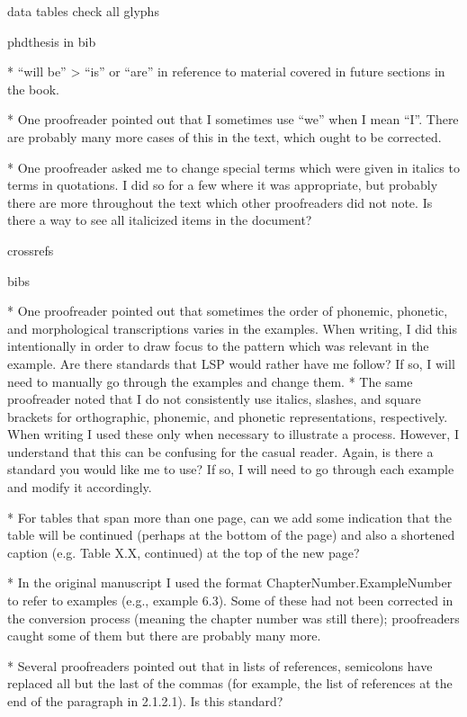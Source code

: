 data 
tables
check all glyphs  

phdthesis in bib
 
  
  *   “will be” > “is” or “are” in reference to material covered in future sections in the book.
 
  *   One proofreader pointed out that I sometimes use “we” when I mean “I”. There are probably many more cases of this in the text, which ought to be corrected.
  
  *   One proofreader asked me to change special terms which were given in italics to terms in quotations. I did so for a few where it was appropriate, but probably there are more throughout the text which other proofreaders did not note. Is there a way to see all italicized items in the document?
  
  crossrefs
  
  bibs
  
  
  
  *   One proofreader pointed out that sometimes the order of phonemic, phonetic, and morphological transcriptions varies in the examples. When writing, I did this intentionally in order to draw focus to the pattern which was relevant in the example. Are there standards that LSP would rather have me follow? If so, I will need to manually go through the examples and change them.
  *   The same proofreader noted that I do not consistently use italics, slashes, and square brackets for orthographic, phonemic, and phonetic representations, respectively. When writing I used these only when necessary to illustrate a process. However, I understand that this can be confusing for the casual reader. Again, is there a standard you would like me to use? If so, I will need to go through each example and modify it accordingly.
  
  
  *   For tables that span more than one page, can we add some indication that the table will be continued (perhaps at the bottom of the page) and also a shortened caption (e.g. Table X.X, continued) at the top of the new page? 
  
  *   In the original manuscript I used the format ChapterNumber.ExampleNumber to refer to examples (e.g., example 6.3). Some of these had not been corrected in the conversion process (meaning the chapter number was still there); proofreaders caught some of them but there are probably many more.
  
  *   Several proofreaders pointed out that in lists of references, semicolons have replaced all but the last of the commas (for example, the list of references at the end of the paragraph in 2.1.2.1). Is this standard?
   
 
  
  
